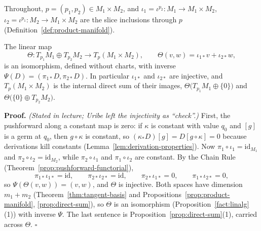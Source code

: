 \documentclass[11pt]{report}
\makeatletter
\newcounter{thmcounter}[section]
\renewenvironment{proof}[1][Proof]{\noindent\textbf{#1.} }{\hfill$\square$\par\vspace{5pt}}
\newcommand{\thmlabel}[1]{\edef\@currentlabel{\arabic{section}.\arabic{thmcounter}}\label{#1}}
\newcommand{\leeref}[1]{\par\smallskip{\raggedleft\footnotesize\textsc{Lee}:\ #1\par}}
\makeatother
\begin{document}
Throughout, $p = (p_1, p_2) \in M_1 \times M_2$, and $\iota_1 = \iota^{p_2} : M_1 \to M_1 \times M_2$, $\iota_2 = \iota^{p_1} : M_2 \to M_1 \times M_2$ are the slice inclusions through $p$ (Definition~\ref{def:product-manifold}).

\begin{thmbox}\thmlabel{thm:tangent-product}
The linear map
\[
\Theta : T_{p_1}M_1 \oplus T_{p_2}M_2 \longrightarrow T_p(M_1 \times M_2), \qquad \Theta(v, w) = \iota_{1*}v + \iota_{2*}w,
\]
is an isomorphism, defined without charts, with inverse $\Psi(D) = (\pi_{1*}D, \pi_{2*}D)$. In particular $\iota_{1*}$ and $\iota_{2*}$ are injective, and $T_p(M_1 \times M_2)$ is the internal direct sum of their images, $\Theta\big(T_{p_1}M_1 \oplus \{0\}\big)$ and $\Theta\big(\{0\} \oplus T_{p_2}M_2\big)$.
\leeref{Proposition 3.14}
\end{thmbox}

\begin{proof}
\textit{(Stated in lecture; Uribe left the injectivity as ``check''.)} First, the pushforward along a constant map is zero: if $\kappa$ is constant with value $q_0$ and $[g]$ is a germ at $q_0$, then $g \circ \kappa$ is constant, so $(\kappa_* D)[g] = D[g \circ \kappa] = 0$ because derivations kill constants (Lemma~\ref{lem:derivation-properties}). Now $\pi_1 \circ \iota_1 = \mathrm{id}_{M_1}$ and $\pi_2 \circ \iota_2 = \mathrm{id}_{M_2}$, while $\pi_2 \circ \iota_1$ and $\pi_1 \circ \iota_2$ are constant. By the Chain Rule (Theorem~\ref{prop:pushforward-functorial}),
\[
\pi_{1*}\iota_{1*} = \mathrm{id}, \qquad \pi_{2*}\iota_{2*} = \mathrm{id}, \qquad \pi_{2*}\iota_{1*} = 0, \qquad \pi_{1*}\iota_{2*} = 0,
\]
so $\Psi(\Theta(v, w)) = (v, w)$, and $\Theta$ is injective. Both spaces have dimension $m_1 + m_2$ (Theorem~\ref{thm:tangent-basis} and Propositions~\ref{prop:product-manifold}, \ref{prop:direct-sum}), so $\Theta$ is an isomorphism (Proposition~\ref{fact:linalg}(1)) with inverse $\Psi$. The last sentence is Proposition~\ref{prop:direct-sum}(1), carried across $\Theta$.
\end{proof}

\begin{center}
\qquad\qquad
{}
\end{center}
\end{document}
